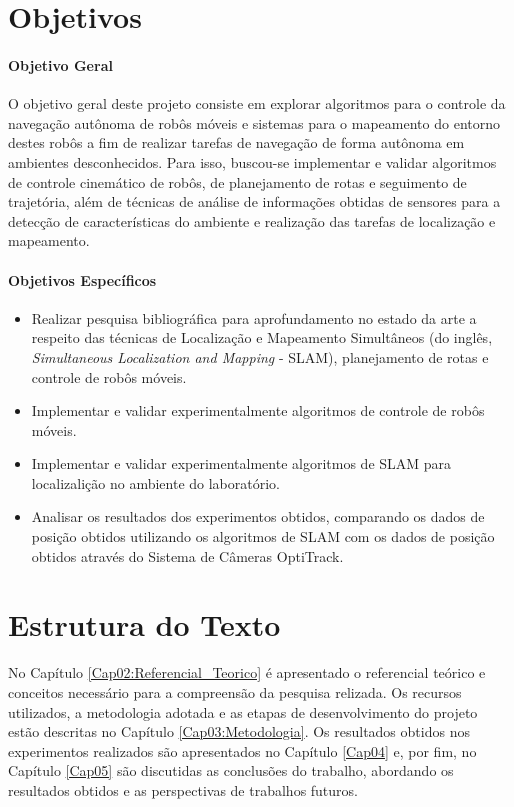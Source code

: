 \section{Objetivos}

\paragraph*{Objetivo Geral}

O objetivo geral deste projeto consiste em explorar algoritmos para o controle da navegação autônoma de robôs móveis e sistemas para o mapeamento do entorno destes robôs a fim de realizar tarefas de navegação de forma autônoma em ambientes desconhecidos. Para isso, buscou-se implementar e validar algoritmos de controle cinemático de robôs, de planejamento de rotas e seguimento de trajetória, além de técnicas de análise de informações obtidas de sensores para a detecção de características do ambiente e realização das tarefas de localização e mapeamento.

\paragraph*{Objetivos Específicos}

\begin{itemize}
\item
Realizar pesquisa bibliográfica para aprofundamento no estado da arte a respeito das técnicas de Localização e Mapeamento Simultâneos (do inglês, \textit{Simultaneous Localization and Mapping} - SLAM), planejamento de rotas e controle de robôs móveis.
\item
Implementar e validar experimentalmente algoritmos de controle de robôs móveis.
\item
Implementar e validar experimentalmente algoritmos de SLAM para localizalição no ambiente do laboratório.
\item
Analisar os resultados dos experimentos obtidos, comparando os dados de posição obtidos utilizando os algoritmos de SLAM com os dados de posição obtidos através do Sistema de Câmeras OptiTrack.
\end{itemize}

\section{Estrutura do Texto}

No Capítulo \ref{Cap02:Referencial_Teorico} é apresentado o referencial teórico e conceitos necessário para a compreensão da pesquisa relizada. Os recursos utilizados, a metodologia adotada e as etapas de desenvolvimento do projeto estão descritas no Capítulo \ref{Cap03:Metodologia}. Os resultados obtidos nos experimentos realizados são apresentados no Capítulo \ref{Cap04} e, por fim, no Capítulo \ref{Cap05} são discutidas as conclusões do trabalho, abordando os resultados obtidos e as perspectivas de trabalhos futuros.